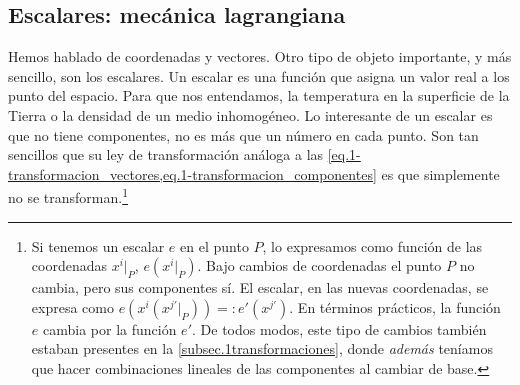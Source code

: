 \subsection{Escalares: mecánica lagrangiana}
\label{subsec.1escalares}

Hemos hablado de coordenadas y vectores. Otro tipo de objeto importante, y más sencillo, son los escalares. Un escalar es una función que asigna un valor real a los punto del espacio. Para que nos entendamos, la temperatura en la superficie de la Tierra o la densidad de un medio inhomogéneo. Lo interesante de un escalar es que no tiene componentes, no es más que un número en cada punto. Son tan sencillos que su ley de transformación análoga a las \cref{eq.1-transformacion_vectores,eq.1-transformacion_componentes} es que simplemente no se transforman.\footnote{Si tenemos un escalar \(e\) en el punto \(P\), lo expresamos como función de las coordenadas \(x^i|_P\), \(e(x^i|_P)\). Bajo cambios de coordenadas el punto \(P\) no cambia, pero sus componentes sí. El escalar, en las nuevas coordenadas, se expresa como \(e(x^i(x^{j'}|_P))=:e'(x^{j'})\). En términos prácticos, la función \(e\) cambia por la función \(e'\). De todos modos, este tipo de cambios también estaban presentes en la \cref{subsec.1transformaciones}, donde \emph{además} teníamos que hacer combinaciones lineales de las componentes al cambiar de base.}

